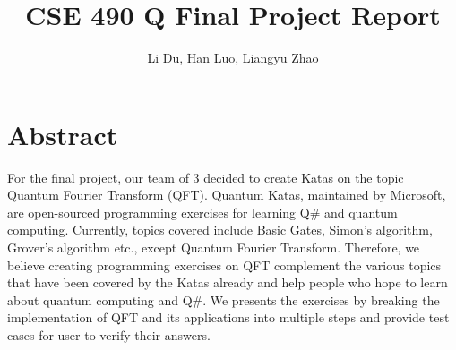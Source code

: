 \documentclass[a4paper]{article}
\title{CSE 490 Q Final Project Report}
\author{Li Du, Han Luo, Liangyu Zhao}
\begin{document}
\maketitle
\section*{{Abstract}}

For the final project, our team of 3 decided to create Katas on the topic Quantum Fourier Transform (QFT). Quantum Katas, maintained by Microsoft, are open-sourced programming exercises for learning Q\# and quantum computing. Currently, topics covered include Basic Gates, Simon's algorithm, Grover's algorithm etc., except Quantum Fourier Transform. Therefore, we believe creating programming exercises on QFT complement the various topics that have been covered by the Katas already and help people who hope to learn about quantum computing and Q\#. We presents the exercises by breaking the implementation of QFT and its applications into multiple steps and provide test cases for user to verify their answers.
\end{document}
